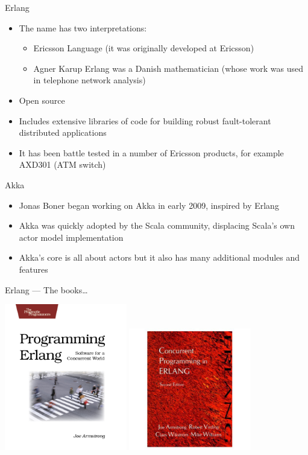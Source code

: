 \documentclass[12pt,xcolor=svgnames]{beamer}
\begin{document}
\begin{frame}{Erlang}
\begin{itemize}
\item The name has two interpretations:
\begin{itemize}
\item Ericsson Language (it was originally developed at Ericsson)
\item Agner Karup Erlang was a Danish mathematician (whose work was used in telephone network analysis)
\end{itemize}
\item Open source
\item Includes extensive libraries of code for building robust fault-tolerant distributed applications
\item It has been battle tested in a number of Ericsson products, for example AXD301 (ATM switch)
\end{itemize}
\end{frame}

\begin{frame}{Akka}
\begin{itemize}
\item Jonas Boner began working on Akka in early 2009, inspired by Erlang
\item Akka was quickly adopted by the Scala community, displacing Scala's own actor model implementation
\item Akka's core is all about actors but it also has many additional modules and features	
\end{itemize}
	
\end{frame}


\begin{frame}{Erlang --- The books\ldots}

\hfill\includegraphics[width=0.4\textwidth]{images/jaerlang.png}
\hfill\includegraphics[width=0.4\textwidth]{images/erlang-book.png}\hfill
\end{frame}
\end{document}

